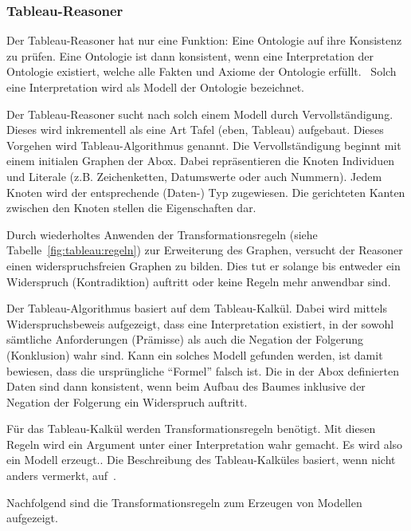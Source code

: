 \subsubsection{Tableau-Reasoner}
\label{ssubsection:inferenz_pellet_tableaux}
Der Tableau-Reasoner hat nur eine Funktion: Eine Ontologie auf ihre Konsistenz zu prüfen. Eine Ontologie ist dann konsistent, wenn eine Interpretation der Ontologie existiert, welche alle Fakten und Axiome der Ontologie erfüllt.~\cite{w3owlsemantics} Solch eine Interpretation wird als Modell der Ontologie bezeichnet.

Der Tableau-Reasoner sucht nach solch einem Modell durch Vervollständigung. Dieses wird inkrementell als eine Art Tafel (eben, Tableau) aufgebaut. Dieses Vorgehen wird Tableau-Algorithmus genannt. Die Vervollständigung beginnt mit einem initialen Graphen der Abox. Dabei repräsentieren die Knoten Individuen und Literale (z.B. Zeichenketten, Datumswerte oder auch Nummern). Jedem Knoten wird der entsprechende (Daten-) Typ zugewiesen. Die gerichteten Kanten zwischen den Knoten stellen die Eigenschaften dar. %

Durch wiederholtes Anwenden der Transformationsregeln (siehe Tabelle~\ref{fig:tableau:regeln}) zur Erweiterung des Graphen, versucht der Reasoner einen widerspruchsfreien Graphen zu bilden. Dies tut er solange bis entweder ein Widerspruch (Kontradiktion) auftritt oder keine Regeln mehr anwendbar sind.

Der Tableau-Algorithmus basiert auf dem Tableau-Kalkül. Dabei wird mittels Widerspruchsbeweis aufgezeigt, dass eine Interpretation existiert, in der sowohl sämtliche Anforderungen (Prämisse) als auch die Negation der Folgerung (Konklusion) wahr sind. Kann ein solches Modell gefunden werden, ist damit bewiesen, dass die ursprüngliche ``Formel'' falsch ist. Die in der Abox definierten Daten sind dann konsistent, wenn beim Aufbau des Baumes inklusive der Negation der Folgerung ein Widerspruch auftritt.~\cite{baumkalkuel}

Für das Tableau-Kalkül werden Transformationsregeln benötigt. Mit diesen Regeln wird ein Argument unter einer Interpretation wahr gemacht. Es wird also ein Modell erzeugt.\cite{baumkalkuel}. Die Beschreibung des Tableau-Kalküles basiert, wenn nicht anders vermerkt, auf~\cite{baumkalkuel}.

Nachfolgend sind die Transformationsregeln zum Erzeugen von Modellen aufgezeigt.

